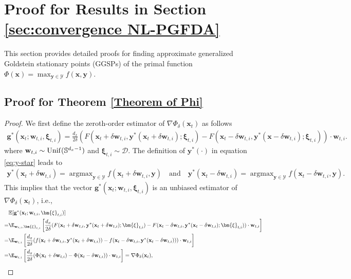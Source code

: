 \documentclass[11pt]{article}
\def\vg{\mathbf{g}}
\def\vw{\mathbf{w}}
\def\vx{\mathbf{x}}
\def\vy{\mathbf{y}}
\def\vxi{\bm{\xi}}
\def\fD{{\mathcal{D}}}
\def\fY{{\mathcal{Y}}}
\def\BE{{\mathbb{E}}}
\DeclareMathOperator*{\argmax}{argmax}
\begin{document}
\section{Proof for Results in Section \ref{sec:convergence NL-PGFDA}}\label{appendix:Phi}

This section provides detailed proofs for finding approximate generalized Goldstein stationary points (GGSPs) of the primal function $\Phi(\vx)=\max_{\vy\in\fY}f(\vx,\vy)$.

\subsection{Proof for Theorem \ref{Theorem of Phi}}

\begin{proof} 
We first define the zeroth-order estimator of $\nabla \Phi_\delta(\vx_t)$ as follows
\begin{align*}
\vg^*(\vx_t;\vw_{t,i},\vxi_{t,i})\!=\!\frac{d_x}{2\delta}(F(\vx_t\!+\!\delta\vw_{t,i},\vy^*(\vx_t\!+\!\delta\vw_{t,i});\vxi_{t,i})\!-\!F(\vx_t\!-\!\delta\vw_{t,i},\vy^*(\vx\!-\!\delta\vw_{t,i});\vxi_{t,i}))\cdot\vw_{t,i}.
\end{align*}
where $\vw_{t,i}\sim{\rm Unif}(\mathbb{S}^{d_x-1})$ and $\vxi_{t,i}\sim\fD$.
The definition of $\vy^*(\cdot)$ in equation \eqref{eq:y-star} leads to
\begin{align*}
    \vy^*(\vx_t+\delta\vw_{t,i})=\argmax_{\vy\in\mathcal Y} f(\vx_t+\delta\vw_{t,i},\vy)
    \quad \text{and} \quad 
    \vy^*(\vx_t-\delta\vw_{t,i})=\argmax_{\vy\in\mathcal Y} f(\vx_t -\delta\vw_{t,i},\vy).
\end{align*}
This implies that the vector $\vg^*(\vx_t;\vw_{t,i},\vxi_{t,i})$ is an unbiased estimator of $\nabla \Phi_\delta(\vx_t)$, i.e.,
\begin{align*}
& \BE[\vg^*(\vx_t;\vw_{t,i},\vxi_{t,i})] \\
=& \E_{\vw_{t,i},\vxi_{t,i}}\left[\frac{d_x}{2\delta}(F(\vx_t+\delta\vw_{t,i},\vy^*(\vx_t+\delta\vw_{t,i});\vxi_{t,i})-F(\vx_t-\delta\vw_{t,i},\vy^*(\vx_t-\delta\vw_{t,i});\vxi_{t,i}))\cdot\vw_{t,i}\right]
\\
=& \E_{\vw_{t,i}}\left[\frac{d_x}{2\delta}(f(\vx_t+\delta\vw_{t,i},\vy^*(\vx_t+\delta\vw_{t,i}))-f(\vx_t-\delta\vw_{t,i},\vy^*(\vx_t-\delta\vw_{t,i})))\cdot\vw_{t,i}\right]\\
= & \E_{\vw_{t,i}}\left[\frac{d_x}{2\delta}(\Phi(\vx_t+\delta\vw_{t,i})-\Phi(\vx_t-\delta\vw_{t,i}))\cdot\vw_{t,i}\right]
=\nabla\Phi_\delta(\vx_t),
\end{align*}

\end{proof}
\end{document}
